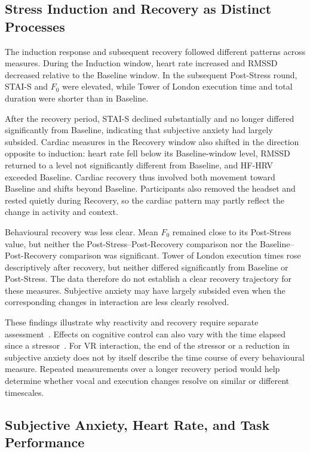 \subsection{Stress Induction and Recovery as Distinct Processes}
\label{sec:discussion-recovery}

The induction response and subsequent recovery followed different patterns across measures. During the Induction window, heart rate increased and RMSSD decreased relative to the Baseline window. In the subsequent Post-Stress round, STAI-S and \(F_0\) were elevated, while Tower of London execution time and total duration were shorter than in Baseline.

After the recovery period, STAI-S declined substantially and no longer differed significantly from Baseline, indicating that subjective anxiety had largely subsided. Cardiac measures in the Recovery window also shifted in the direction opposite to induction: heart rate fell below its Baseline-window level, RMSSD returned to a level not significantly different from Baseline, and HF-HRV exceeded Baseline. Cardiac recovery thus involved both movement toward Baseline and shifts beyond Baseline. Participants also removed the headset and rested quietly during Recovery, so the cardiac pattern may partly reflect the change in activity and context.

Behavioural recovery was less clear. Mean \(F_0\) remained close to its Post-Stress value, but neither the Post-Stress--Post-Recovery comparison nor the Baseline--Post-Recovery comparison was significant. Tower of London execution times rose descriptively after recovery, but neither differed significantly from Baseline or Post-Stress. The data therefore do not establish a clear recovery trajectory for these measures. Subjective anxiety may have largely subsided even when the corresponding changes in interaction are less clearly resolved.

These findings illustrate why reactivity and recovery require separate assessment~\citep{linden1997physiological,chida2008chronic}. Effects on cognitive control can also vary with the time elapsed since a stressor~\citep{plessow2011inflexibly}. For VR interaction, the end of the stressor or a reduction in subjective anxiety does not by itself describe the time course of every behavioural measure. Repeated measurements over a longer recovery period would help determine whether vocal and execution changes resolve on similar or different timescales.


\subsection{Subjective Anxiety, Heart Rate, and Task Performance}
\label{sec:discussion-context}


